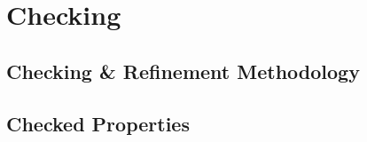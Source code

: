 \section{Checking}
\label{sec:checking}

\subsection{Checking \& Refinement Methodology}

\subsection{Checked Properties}
